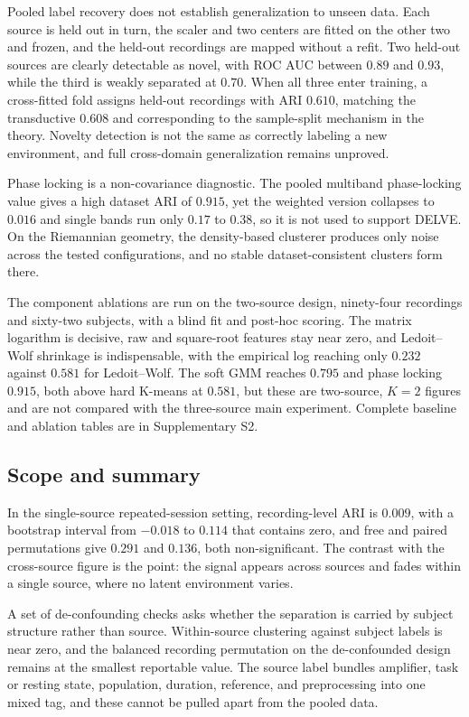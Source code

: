 Pooled label recovery does not establish generalization to unseen data.
Each source is held out in turn, the scaler and two centers are fitted
on the other two and frozen, and the held-out recordings are mapped
without a refit. Two held-out sources are clearly detectable as novel,
with ROC AUC between \(0.89\) and \(0.93\), while the third is weakly
separated at \(0.70\). When all three enter training, a cross-fitted
fold assigns held-out recordings with ARI \(0.610\), matching the
transductive \(0.608\) and corresponding to the sample-split mechanism
in the theory. Novelty detection is not the same as correctly labeling a
new environment, and full cross-domain generalization remains unproved.

Phase locking is a non-covariance diagnostic. The pooled multiband
phase-locking value gives a high dataset ARI of \(0.915\), yet the
weighted version collapses to \(0.016\) and single bands run only
\(0.17\) to \(0.38\), so it is not used to support DELVE. On the
Riemannian geometry, the density-based clusterer produces only noise
across the tested configurations, and no stable dataset-consistent
clusters form there.

The component ablations are run on the two-source design, ninety-four
recordings and sixty-two subjects, with a blind fit and post-hoc
scoring. The matrix logarithm is decisive, raw and square-root features
stay near zero, and Ledoit--Wolf shrinkage is indispensable, with the
empirical log reaching only \(0.232\) against \(0.581\) for
Ledoit--Wolf. The soft GMM reaches \(0.795\) and phase locking
\(0.915\), both above hard K-means at \(0.581\), but these are
two-source, \(K=2\) figures and are not compared with the three-source
main experiment. Complete baseline and ablation tables are in
Supplementary S2.

\subsection{Scope and summary}\label{scope-and-summary}

In the single-source repeated-session setting, recording-level ARI is
\(0.009\), with a bootstrap interval from \(-0.018\) to \(0.114\) that
contains zero, and free and paired permutations give \(0.291\) and
\(0.136\), both non-significant. The contrast with the cross-source
figure is the point: the signal appears across sources and fades within
a single source, where no latent environment varies.

A set of de-confounding checks asks whether the separation is carried by
subject structure rather than source. Within-source clustering against
subject labels is near zero, and the balanced recording permutation on
the de-confounded design remains at the smallest reportable value. The
source label bundles amplifier, task or resting state, population,
duration, reference, and preprocessing into one mixed tag, and these
cannot be pulled apart from the pooled data.

